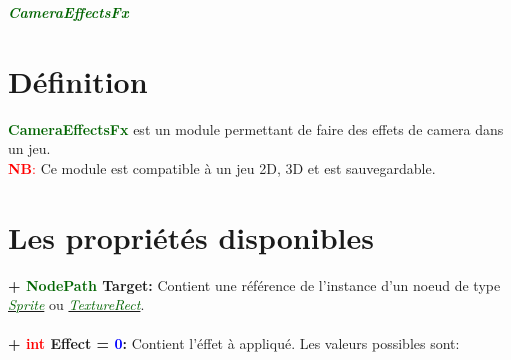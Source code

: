 \documentclass[a4paper, 11pt]{article}
\begin{document}
	\pagecolor{silver}
	\huge{\hspace{13.3cm}\textit{\textbf{\textcolor{darkgreen}{CameraEffectsFx}}}}\large{} \tableofcontents
	\newpage
	\section{Définition}
	\textcolor{darkgreen}{\textbf{CameraEffectsFx}} est un module permettant de faire des effets de camera 
	dans un jeu.\\
	\textcolor{red}{\textbf{NB}:} Ce module est compatible à un jeu 2D, 3D et est sauvegardable.

	\section{Les propriétés disponibles}
	\textbf{+ \textcolor{darkgreen}{NodePath} Target:} Contient une référence de l'instance d'un noeud de 
	type \href{https://docs.godotengine.org/en/stable/classes/class_sprite.html}
	{\textit{\textcolor{darkgreen}{Sprite}}} ou
	\href{https://docs.godotengine.org/en/stable/classes/class_texturerect.html}
	{\textit{\textcolor{darkgreen}{TextureRect}}}.\\\\
	\textbf{+ \textcolor{red}{int} Effect = \textcolor{blue}{0}:} Contient l'éffet à appliqué. Les valeurs 
	possibles sont:
\end{document}
